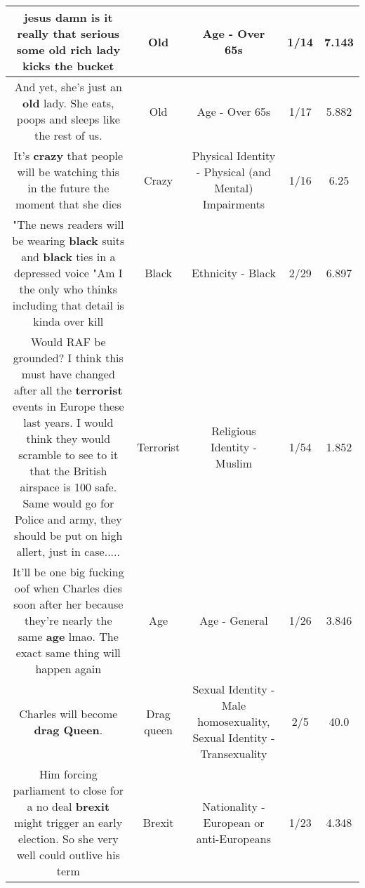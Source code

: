\documentclass[11pt]{article}
\newlength\mylength
\begin{document}
\begin{center}
\begin{longtable}{|C{.65\mylength}|C{.30\mylength}|C{.12\mylength}|C{.12\mylength}|C{.12\mylength}|}
  \small jesus damn is it really that serious some \textbf{old} rich lady kicks the bucket\normalsize   & Old & Age - Over 65s & 1/14 & 7.143 \\  \hline
  \small And yet, she's just an \textbf{old} lady. She eats, poops and sleeps like the rest of us.\normalsize   & Old & Age - Over 65s & 1/17 & 5.882 \\  \hline
  \small It's \textbf{crazy} that people will be watching this in the future the moment that she dies\normalsize   & Crazy & Physical Identity - Physical (and Mental) Impairments & 1/16 & 6.25 \\  \hline
  \small "The news readers will be wearing \textbf{black} suits and \textbf{black} ties in a depressed voice "Am I the only who thinks including that detail is kinda over kill\normalsize   & Black & Ethnicity - Black & 2/29 & 6.897 \\  \hline
  \small Would RAF be grounded? I think this must have changed after all the \textbf{terrorist} events in Europe these last years. I would think they would scramble to see to it that the British airspace is 100 safe. Same would go for Police and army, they should be put on high allert, just in case.....\normalsize   & Terrorist & Religious Identity - Muslim & 1/54 & 1.852 \\  \hline
  \small It'll be one big fucking oof when Charles dies soon after her because they're nearly the same \textbf{age} lmao. The exact same thing will happen again\normalsize   & Age & Age - General & 1/26 & 3.846 \\  \hline
  \small Charles will become \textbf{d\textbf{rag Queen}}.\normalsize   & Drag queen & Sexual Identity - Male homosexuality, Sexual Identity - Transexuality & 2/5 & 40.0 \\  \hline
  \small Him forcing parliament to close for a no deal \textbf{brexit} might trigger an early election. So she very well could outlive his term\normalsize   & Brexit & Nationality - European or anti-Europeans & 1/23 & 4.348 \\  \hline

\end{longtable}
\end{center}
\end{document}
